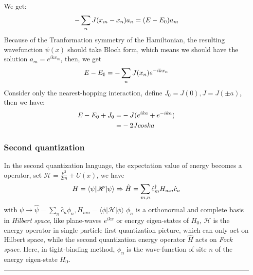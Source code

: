 \documentclass[letterpaper,10pt,english]{sphinxmanual}
\begin{document}
We get:
\begin{gather}
\begin{split}-\sum_n J(x_m-x_n) a_n=(E-E_0) a_m\end{split}\notag
\end{gather}
Because of the Tranformation symmetry of the Hamiltonian, the resulting
wavefunction \(\psi(x)\) should take Bloch form, which means we
should have the solution \(a_m=e^{ikx_m}\), then, we get
\begin{gather}
\begin{split}E-E_0=-\sum_n J(x_n)e^{-ikx_n}\end{split}\notag
\end{gather}
Consider only the nearest-hopping interaction, define
\(J_0=J(0), J=J(\pm a)\), then we have:
\begin{gather}
\begin{split}E-E_0+J_0=&-J(e^{ika}+e^{-ika}) \\
=&-2Jcoska\end{split}\notag
\end{gather}

\subsubsection{Second quantization}
\label{TI/Lecture notes/1:second-quantization}
In the second quantization language, the expectation value of energy
becomes a operator, set \(\mathscr{H}=\frac{p^2}{2m}+U(x)\), we have
\begin{gather}
\begin{split}H=\langle \psi|\mathscr{H}|\psi \rangle \Rightarrow \hat{H}=\sum_{m,n}\hat{c}_m^\dagger H_{mn}\hat{c}_n\end{split}\notag
\end{gather}
with
\(\psi \to \hat{\psi}=\sum\limits_n \hat{c}_n \phi_n, H_{mn}=\langle \phi|\mathscr{H}|\phi \rangle\)
\(\phi_n\) is a orthonormal and complete basis in \emph{Hilbert space},
like plane-waves \(e^{ikx}\) or energy eigen-states of \(H_0\),
\(\mathscr{H}\) is the energy operator in single particle first
quantization picture, which can only act on Hilbert space, while the
second quantization energy operator \(\hat{H}\) acts on \emph{Fock
space}. Here, in tight-binding method, \(\phi_n\) is the
wave-function of site \(n\) of the energy eigen-state \(H_0\).


\bigskip\hrule{}\bigskip
\end{document}
